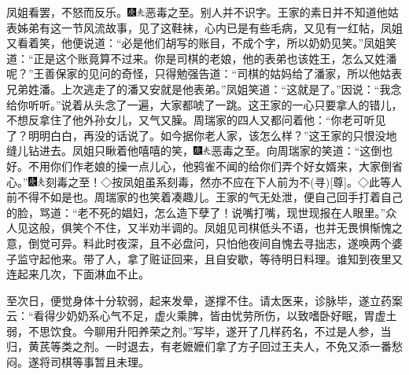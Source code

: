 凤姐看罢，不怒而反乐。{\includegraphics[width=3mm]{../Images/00004}\includegraphics[width=3mm]{../Images/00012}\footnotesize \kaishu 恶毒之至。}别人并不识字。王家的素日并不知道他姑表姊弟有这一节风流故事，见了这鞋袜，心内已是有些毛病，又见有一红帖，凤姐又看着笑，他便说道：``必是他们胡写的账目，不成个字，所以奶奶见笑。''凤姐笑道：``正是这个账竟算不过来。你是司棋的老娘，他的表弟也该姓王，怎么又姓潘呢？''王善保家的见问的奇怪，只得勉强告道：``司棋的姑妈给了潘家，所以他姑表兄弟姓潘。上次逃走了的潘又安就是他表弟。''凤姐笑道：``这就是了。''因说：``我念给你听听。''说着从头念了一遍，大家都唬了一跳。这王家的一心只要拿人的错儿，不想反拿住了他外孙女儿，又气又臊。周瑞家的四人又都问着他：``你老可听见了？明明白白，再没的话说了。如今据你老人家，该怎么样？''这王家的只恨没地缝儿钻进去。凤姐只瞅着他嘻嘻的笑，{\includegraphics[width=3mm]{../Images/00004}\includegraphics[width=3mm]{../Images/00012}\footnotesize \kaishu 恶毒之至。}向周瑞家的笑道：``这倒也好。不用你们作老娘的操一点儿心，他鸦雀不闻的给你们弄个好女婿来，大家倒省心。''{\includegraphics[width=3mm]{../Images/00004}\includegraphics[width=3mm]{../Images/00012}\footnotesize \kaishu 刻毒之至！◇按凤姐虽系刻毒，然亦不应在下人前为不{(寻)}{[}尊{]}。◇此等人前不得不如是也。}周瑞家的也笑着凑趣儿。王家的气无处泄，便自己回手打着自己的脸，骂道：``老不死的娼妇，怎么造下孽了！说嘴打嘴，现世现报在人眼里。''众人见这般，俱笑个不住，又半劝半调的。凤姐见司棋低头不语，也并无畏惧惭愧之意，倒觉可异。料此时夜深，且不必盘问，只怕他夜间自愧去寻拙志，遂唤两个婆子监守起他来。带了人，拿了赃证回来，且自安歇，等待明日料理。谁知到夜里又连起来几次，下面淋血不止。

至次日，便觉身体十分软弱，起来发晕，遂撑不住。请太医来，诊脉毕，遂立药案云：``看得少奶奶系心气不足，虚火乘脾，皆由忧劳所伤，以致嗜卧好眠，胃虚土弱，不思饮食。今聊用升阳养荣之剂。''写毕，遂开了几样药名，不过是人参，当归，黄芪等类之剂。一时退去，有老嬷嬷们拿了方子回过王夫人，不免又添一番愁闷。遂将司棋等事暂且未理。

